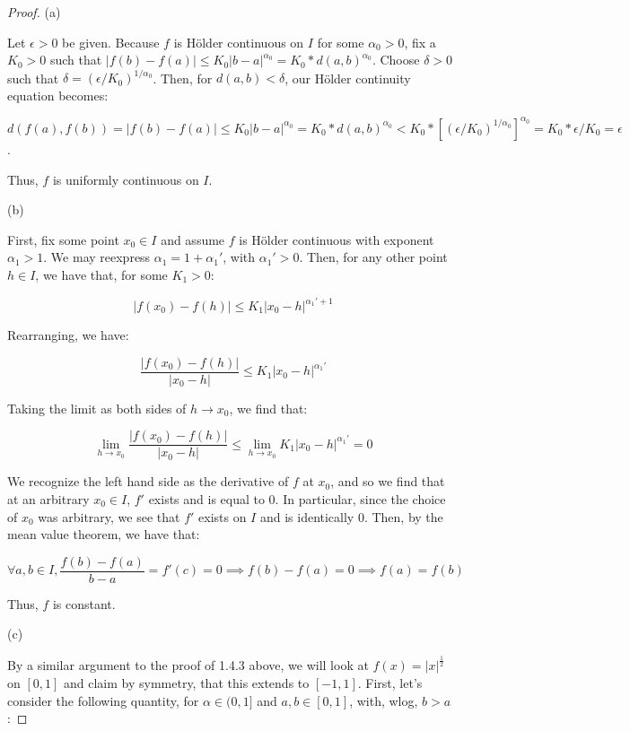 \documentclass[10pt]{article}
\begin{document}
\begin{proof}[Proof]

(a)

Let $\epsilon > 0$ be given. Because $f$ is  H\"{o}lder continuous on $I$ for some $\alpha_0 > 0$, fix a $K_0 > 0$ such that $|f(b) - f(a)| \leq K_0|b - a|^{\alpha_0} = K_0 * d(a,b)^{\alpha_0}$.  Choose $\delta> 0$ such that $\delta = (\epsilon/K_0)^{1/\alpha_0}$. Then, for $d(a,b) < \delta$, our  H\"{o}lder continuity equation becomes:

$$ d(f(a),f(b)) = |f(b) - f(a)|  \leq K_0|b - a|^{\alpha_0} = K_0 * d(a,b)^{\alpha_0} < K_0 * [(\epsilon/K_0)^{1/\alpha_0}]^{\alpha_0} = K_0 * \epsilon/K_0 = \epsilon$$.

Thus, $f$ is uniformly continuous on $I$.

(b)

First, fix some point $x_0 \in I$ and assume $f$ is H\"{o}lder continuous with exponent $\alpha_1 > 1$. We may reexpress $\alpha_1 = 1 + \alpha_1'$, with $\alpha_1' > 0$. Then, for any other point $h \in I$, we have that, for some $K_1 > 0$:

$$ |f(x_0) - f(h)| \leq K_1 |x_0 - h|^{\alpha_1' + 1} $$

Rearranging, we have:

$$ \frac{|f(x_0) - f(h)|}{|x_0 - h|} \leq K_1 |x_0 - h|^{\alpha_1'} $$

Taking the limit as both sides of $h \rightarrow x_0$, we find that:

$$\lim_{h \rightarrow x_0} \frac{|f(x_0) - f(h)|}{|x_0 - h|} \leq \lim_{h \rightarrow x_0} K_1 |x_0 - h|^{\alpha_1'} = 0 $$

We recognize the left hand side as the derivative of $f$ at $x_0$, and so we find that at an arbitrary $x_0 \in I$, $f'$ exists and is equal to 0. In particular, since the choice of $x_0$ was arbitrary, we see that $f'$ exists on $I$ and is identically $0$. Then, by the mean value theorem, we have that:

$$ \forall a,b \in I, \frac{f(b) - f(a)}{b-a} = f'(c) = 0  \implies f(b) - f(a) = 0 \implies f(a) = f(b)$$

Thus, $f$ is constant.

(c)

By a similar argument to the proof of 1.4.3 above, we will look at $f(x) = |x|^{\frac{1}{2}}$ on $[0,1]$ and claim by symmetry, that this extends to $[-1,1]$. First, let's consider the following quantity, for $\alpha \in (0,1]$ and $a,b \in [0,1]$, with, wlog, $b > a$:


\end{proof}
\end{document}

